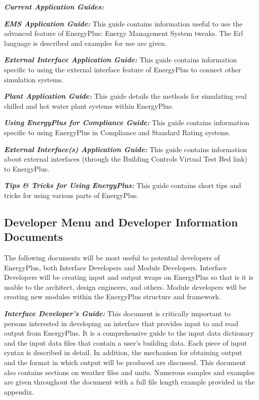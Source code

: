 \textbf{\emph{Current Application Guides:}}

\textbf{\emph{EMS Application Guide:}} This guide contains information useful to use the advanced feature of EnergyPlus: Energy Management System tweaks. The Erl language is described and examples for use are given.

\textbf{\emph{External Interface Application Guide:}} This guide contains information specific to using the external interface feature of EnergyPlus to connect other simulation systems.

\textbf{\emph{Plant Application Guide:}} This guide details the methods for simulating real chilled and hot water plant systems within EnergyPlus.

\textbf{\emph{Using EnergyPlus for Compliance Guide:}} This guide contains information specific to using EnergyPlus in Compliance and Standard Rating systems.

\textbf{\emph{External Interface(s) Application Guide:}} This guide contains information about external interfaces (through the Building Controls Virtual Test Bed link) to EnergyPlus.

\textbf{\emph{Tips \& Tricks for Using EnergyPlus:}} This guide contains short tips and tricks for using various parts of EnergyPlus.

\subsection{Developer Menu and Developer Information Documents}\label{developer-menu-and-developer-information-documents}

The following documents will be most useful to potential developers of EnergyPlus, both Interface Developers and Module Developers. Interface Developers will be creating input and output wraps on EnergyPlus so that is it is usable to the architect, design engineers, and others. Module developers will be creating new modules within the EnergyPlus structure and framework.

\textbf{\emph{Interface Developer's Guide:}} This document is critically important to persons interested in developing an interface that provides input to and read output from EnergyPlus. It is a comprehensive guide to the input data dictionary and the input data files that contain a user's building data. Each piece of input syntax is described in detail. In addition, the mechanism for obtaining output and the format in which output will be produced are discussed. This document also contains sections on weather files and units. Numerous samples and examples are given throughout the document with a full file length example provided in the appendix.

